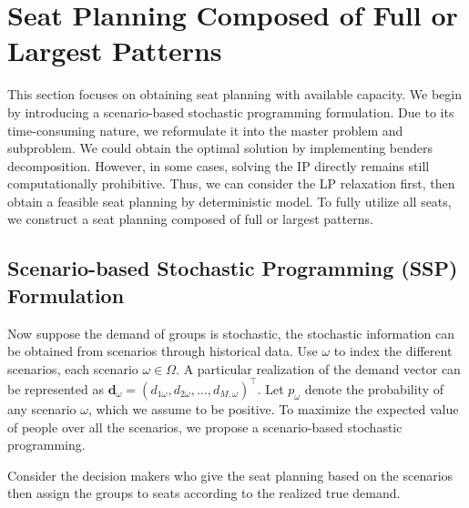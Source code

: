 
\section{Seat Planning Composed of Full or Largest Patterns}
This section focuses on obtaining seat planning with available capacity. We begin by introducing a scenario-based stochastic programming formulation. Due to its time-consuming nature, we reformulate it into the master problem and subproblem. We could obtain the optimal solution by implementing benders decomposition. However, in some cases, solving the IP directly remains still computationally prohibitive. Thus, we can consider the LP relaxation first, then obtain a feasible seat planning by deterministic model. To fully utilize all seats, we construct a seat planning composed of full or largest patterns.

\subsection{Scenario-based Stochastic Programming (SSP) Formulation}
Now suppose the demand of groups is stochastic, the stochastic information can be obtained from scenarios through historical data. Use $\omega$ to index the different scenarios, each scenario $\omega \in \Omega$. A particular realization of the demand vector can be represented as $\mathbf{d}_\omega = (d_{1\omega},d_{2\omega},\ldots,d_{M,\omega})^{\intercal}$. Let $p_{\omega}$ denote the probability of any scenario $\omega$, which we assume to be positive. To maximize the expected value of people over all the scenarios, we propose a scenario-based stochastic programming.

Consider the decision makers who give the seat planning based on the scenarios then assign the groups to seats according to the realized true demand. 

